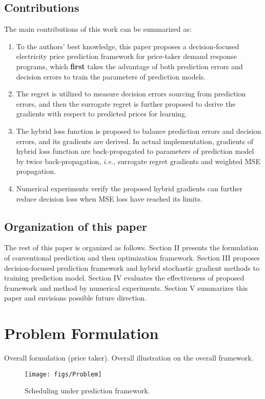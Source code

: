 \documentclass[journal]{IEEEtran}
\newcommand{\slw}{\color{blue}}
\begin{document}
\subsection{Contributions}
The main contributions of this work can be summarized as:
\begin{enumerate}[\IEEEsetlabelwidth{12)}]
  \item To the authors' best knowledge, this paper proposes a decision-focused electricity price prediction framework for price-taker demand response programs, which \textbf{first} takes the advantage of both prediction errors and decision errors to train the parameters of prediction models.
  \item The regret is utilized to measure decision errors sourcing from prediction errors, and then the surrogate regret is further proposed to derive the gradients with respect to predicted prices for learning.
  \item The hybrid loss function is proposed to balance prediction errors and decision errors, and its gradients are derived. In actual implementation, gradients of hybrid loss function are back-propagated to parameters of prediction model by twice back-propagation, \textit{i.e.}, surrogate regret gradients and weighted MSE propagation.
  \item Numerical experiments verify the proposed hybrid gradients can further reduce decision loss when MSE loss have reached its limits.
\end{enumerate}

\subsection{Organization of this paper}
The rest of this paper is organized as follows. Section II presents the formulation of conventional prediction and then optimization framework. Section III proposes decision-focused prediction framework and hybrid stochastic gradient methods to training prediction model. Section IV evaluates the effectiveness of proposed framework and method by numerical experiments. Section V summarizes this paper and envisions possible future direction.

\section{Problem Formulation}
Overall formulation (price taker). {\slw Overall illustration on the overall framework.}

\begin{figure}[ht]
  \centering
  \texttt{[image: figs/Problem]}
  \caption{Scheduling under prediction framework.}
  \label{Problemform}
\end{figure}
\end{document}
